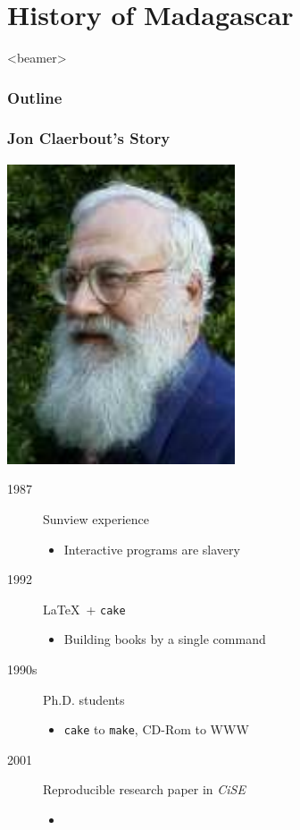 \section{History of Madagascar}

\begin{frame}<beamer>
  \MadLogo
  \frametitle{Outline}
  \tableofcontents[currentsection]
\end{frame}

\begin{frame}
  \MadLogo
  \frametitle{Jon Claerbout's Story}

  {\flushright
  \includegraphics[height=0.2\textheight]{Fig/Claerbout}
  } 

  \begin{description}
  \item[1987] Sunview experience
  \begin{itemize}
  \item Interactive programs are slavery
  \end{itemize}
  \item[1992] \LaTeX\ + \texttt{cake}
  \begin{itemize}
  \item Building books by a single command
  \end{itemize}
  \item[1990s] Ph.D. students
  \begin{itemize}
  \item \texttt{cake} to \texttt{make}, CD-Rom to WWW
  \end{itemize}
  \item[2001] Reproducible research paper in \emph{CiSE}
  \begin{itemize}
  \item {\color{blue}{The principal beneficiary is the author}}
  \end{itemize}
  \end{description}
\end{frame}

